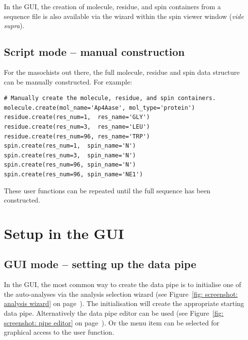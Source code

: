 In the GUI, the creation of molecule, residue, and spin containers from a sequence file is also available via the  wizard within the spin viewer window (\textit{vide supra}).



\subsection{Script mode -- manual construction} \label{sect: script - manual construction}

For the masochists out there, the full molecule, residue and spin data structure can be manually constructed.  For example:

\begin{lstlisting}
# Manually create the molecule, residue, and spin containers.
molecule.create(mol_name='Ap4Aase', mol_type='protein')
residue.create(res_num=1,  res_name='GLY')
residue.create(res_num=3,  res_name='LEU')
residue.create(res_num=96, res_name='TRP')
spin.create(res_num=1,  spin_name='N')
spin.create(res_num=3,  spin_name='N')
spin.create(res_num=96, spin_name='N')
spin.create(res_num=96, spin_name='NE1')
\end{lstlisting}

These user functions can be repeated until the full sequence has been constructed.




\section{Setup in the GUI}



\subsection{GUI mode -- setting up the data pipe} \label{sect: GUI - data pipe}

In the GUI, the most common way to create the data pipe is to initialise one of the auto-analyses via the analysis selection wizard (see Figure~\ref{fig: screenshot: analysis wizard} on page~\pageref{fig: screenshot: analysis wizard}).  The initialisation will create the appropriate starting data pipe.  Alternatively the data pipe editor can be used (see Figure~\ref{fig: screenshot: pipe editor} on page~\pageref{fig: screenshot: pipe editor}).  Or the  menu item can be selected for graphical access to the  user function.



